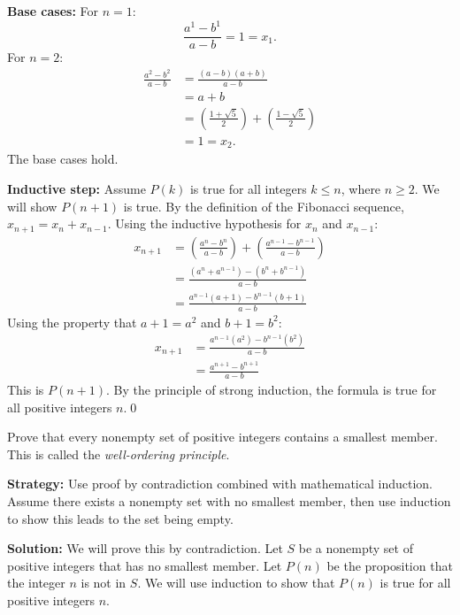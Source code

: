 \textbf{Base cases:}
For $n=1$:
\[ \frac{a^1 - b^1}{a-b} = 1 = x_1. \]
For $n=2$:
\begin{align*}
\frac{a^2 - b^2}{a-b} &= \frac{(a-b)(a+b)}{a-b}\\
&= a+b\\
&= \left(\frac{1+\sqrt{5}}{2}\right) + \left(\frac{1-\sqrt{5}}{2}\right)\\
&= 1 = x_2.
\end{align*}
The base cases hold.

\textbf{Inductive step:}
Assume $P(k)$ is true for all integers $k \leq n$, where $n \geq 2$. We will show $P(n+1)$ is true.
By the definition of the Fibonacci sequence, $x_{n+1} = x_n + x_{n-1}$.
Using the inductive hypothesis for $x_n$ and $x_{n-1}$:
\begin{align*}
x_{n+1} &= \left( \frac{a^n - b^n}{a-b} \right) + \left( \frac{a^{n-1} - b^{n-1}}{a-b} \right) \\
&= \frac{(a^n + a^{n-1}) - (b^n + b^{n-1})}{a-b} \\
&= \frac{a^{n-1}(a+1) - b^{n-1}(b+1)}{a-b}
\end{align*}
Using the property that $a+1 = a^2$ and $b+1 = b^2$:
\begin{align*}
x_{n+1} &= \frac{a^{n-1}(a^2) - b^{n-1}(b^2)}{a-b} \\
&= \frac{a^{n+1} - b^{n+1}}{a-b}
\end{align*}
This is $P(n+1)$. By the principle of strong induction, the formula is true for all positive integers $n$.\qed



\begin{problembox}
\begin{problemstatement}
Prove that every nonempty set of positive integers contains a smallest member. This is called the \textit{well-ordering principle}.
\end{problemstatement}
\end{problembox}

\noindent\textbf{Strategy:} Use proof by contradiction combined with mathematical induction. Assume there exists a nonempty set with no smallest member, then use induction to show this leads to the set being empty.

\bigskip\noindent\textbf{Solution:}
We will prove this by contradiction.
Let $S$ be a nonempty set of positive integers that has no smallest member.
Let $P(n)$ be the proposition that the integer $n$ is not in $S$. We will use induction to show that $P(n)$ is true for all positive integers $n$.

